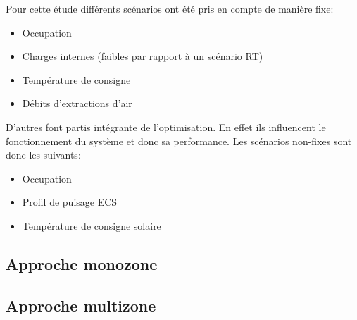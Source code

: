 Pour cette étude différents scénarios ont été pris en compte de manière fixe:
\begin{itemize}
    \item Occupation
    \item Charges internes (faibles par rapport à un scénario RT)
    \item Température de consigne
    \item Débits d’extractions d’air
\end{itemize}

D’autres font partis intégrante de l’optimisation. En effet ils influencent le
fonctionnement du système et donc sa performance. Les scénarios non-fixes sont donc
les suivants:
\begin{itemize}
    \item Occupation
    \item Profil de puisage ECS
    \item Température de consigne solaire
\end{itemize}


\subsection{Approche monozone} %
\label{sub:approche_monozone}


\subsection{Approche multizone} %
\label{sub:approche_multizone}




